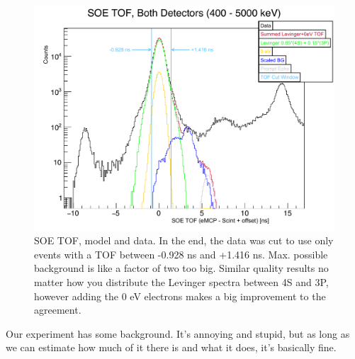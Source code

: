 \begin{figure}[h!tb]
	\centering
	\includegraphics[width=.999\linewidth]
	{Figures/SOE_TOF_Spectra.pdf}
	\caption{SOE TOF, model and data.  In the end, the data was cut to use only events with a TOF between -0.928 ns and +1.416 ns.  Max. possible background is like a factor of two too big.  Similar quality results no matter how you distribute the Levinger spectra between 4S and 3P, however adding the 0 eV electrons makes a big improvement to the agreement. }	
	\label{fig:soetof}
\end{figure}


Our experiment has some background.  It's annoying and stupid, but as long as we can estimate how much of it there is and what it does, it's basically fine.

